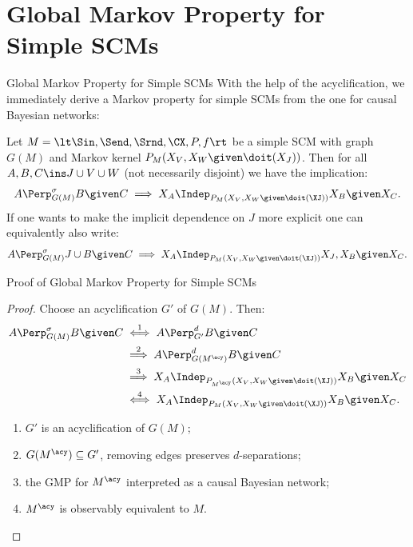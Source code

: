 \part{Global Markov Property for Simple SCMs}
\frame{\partpage}

\begin{frame}{Global Markov Property for Simple SCMs}
  With the help of the acyclification, we immediately derive a Markov property for simple SCMs from the one for causal Bayesian networks:
  \begin{Cor}[\ref{cor:gmp_simple_scm}]
    Let $M = \lt \Sin, \Send, \Srnd, \CX, P, f \rt$ be a simple SCM with graph $G(M)$
    and Markov kernel $P_{M}(X_V,X_W \given \doit(X_J))$.
    Then for all $A, B, C \ins J \cup V \cup W$ (not necessarily disjoint) we have the implication:
    $$A \Perp^\sigma_{G(M)} B \given C \implies X_A \Indep_{P_{M}(X_V,X_W \given \doit(\XJ))} X_B \given X_C.$$
    If one wants to make the implicit dependence on $J$ more explicit one can equivalently also write:
    $$A \Perp^\sigma_{G(M)} J \cup B \given C \implies X_A \Indep_{P_{M}(X_V,X_W \given \doit(\XJ))} X_J,X_B \given X_C.$$
  \end{Cor}
\end{frame}

\begin{frame}{Proof of Global Markov Property for Simple SCMs}
\begin{proof}
  \setlength\abovedisplayskip{10pt}
  \setlength\belowdisplayskip{0pt}
  Choose an acyclification $G'$ of $G(M)$. Then:
  \begin{align*}
    A \Perp^\sigma_{G(M)} B \given C &\stackrel{1}{\iff} A \Perp^d_{G'} B \given C \\
    &\stackrel{2}{\implies} A \Perp^d_{G(M^\acy)} B \given C \\
    &\stackrel{3}{\implies} X_A \Indep_{P_{M^{\acy}}(X_V,X_W \given \doit(\XJ))} X_B \given X_C \\
    &\stackrel{4}{\iff} X_A \Indep_{P_{M}(X_V,X_W \given \doit(\XJ))} X_B \given X_C.
  \end{align*}
  \begin{enumerate}
    \item $G'$ is an acyclification of $G(M)$; 
    \item $G(M^\acy) \subseteq G'$, removing edges preserves $d$-separations; 
    \item the GMP for $M^\acy$ interpreted as a causal Bayesian network;
    \item $M^\acy$ is observably equivalent to $M$.
  \end{enumerate}
\end{proof}
\end{frame}

